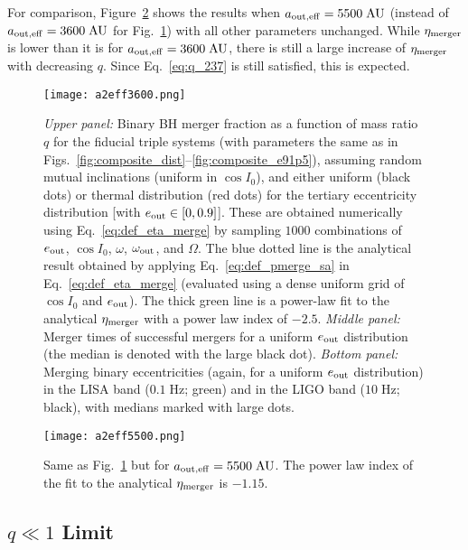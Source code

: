 \documentclass[
        fleqn,
        usenatbib,
    ]{mnras}
\begin{document}
For comparison, Figure~\ref{fig:popsynth5500} shows the results when
$a_{\rm out, eff} = 5500\;\mathrm{AU}$ (instead of $a_{\rm out, eff} =
3600\;\mathrm{AU}$ for Fig.~\ref{fig:popsynth}) with all other parameters
unchanged. While $\eta_{\rm merger}$ is lower than it is for $a_{\rm out, eff} =
3600\;\mathrm{AU}$, there is still a large increase of $\eta_{\rm merger}$ with
decreasing $q$. Since Eq.~\eqref{eq:q_237} is still satisfied, this is expected.
\begin{figure}
    \centering
    \texttt{[image: a2eff3600.png]}
    \caption{\emph{Upper panel:} Binary BH merger fraction as a function of mass
    ratio $q$ for the fiducial triple systems (with parameters the same as in
    Figs.~\ref{fig:composite_dist}--\ref{fig:composite_e91p5}), assuming random
    mutual inclinations (uniform in $\cos I_0$), and either uniform (black dots)
    or thermal distribution (red dots) for the tertiary eccentricity
    distribution [with $e_{\rm out} \in [0,0.9]$]. These are obtained
    numerically using Eq.~\eqref{eq:def_eta_merge} by sampling $1000$
    combinations of $e_{\rm out}$, $\cos I_0$, $\omega$, $\omega_{\rm out}$, and
    $\Omega$. The blue dotted line is the analytical result obtained by applying
    Eq.~\eqref{eq:def_pmerge_sa} in Eq.~\eqref{eq:def_eta_merge} (evaluated
    using a dense uniform grid of $\cos I_0$ and $e_{\rm out}$).
    The thick green line is a power-law fit to the analytical
    $\eta_{\rm merger}$ with a power law index of $-2.5$. \emph{Middle panel:}
    Merger times of successful mergers for a uniform $e_{\rm out}$ distribution
    (the median is denoted with the large black dot). \emph{Bottom panel:}
    Merging binary eccentricities (again, for a uniform $e_{\rm out}$
    distribution) in the LISA band ($0.1\;\mathrm{Hz}$; green) and in the LIGO
    band ($10 \;\mathrm{Hz}$; black), with medians marked with large dots.
    }\label{fig:popsynth}
\end{figure}
\begin{figure}
    \centering
    \texttt{[image: a2eff5500.png]}
    \caption{Same as Fig.~\ref{fig:popsynth} but for $a_{\rm out, eff} =
    5500\;\mathrm{AU}$. The power law index of the fit to the
    analytical $\eta_{\rm merger}$ is $-1.15$. }\label{fig:popsynth5500}
\end{figure}

\subsection{$q \ll 1$ Limit}
\end{document}
